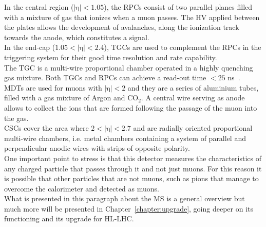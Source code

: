 \vspace{\baselineskip}
In the central region ($\mathrm {|\eta | <1.05}$), the RPCs consist of two parallel planes filled with a mixture of gas that ionizes when a muon passes.
The HV applied between the plates allows the development of avalanches, along the ionization track towards the anode, which constitutes a signal.\\
In the end-cap ($\mathrm {1.05<|\eta |<2.4}$), TGCs are used to complement the RPCs in the triggering system for their good time resolution and rate capability. 
\\The TGC is a multi-wire proportional chamber operated in a highly quenching gas mixture.
Both TGCs and RPCs can achieve a read-out time $\mathrm {<25}$ ns~\cite{MS}.
\vspace{\baselineskip}
\\MDTs are used for muons with $\mathrm {|\eta | <2} $ and they are a series of aluminium tubes, filled with a gas mixture of Argon and $\mathrm {CO_2}$.
A central wire serving as anode allows to collect the ions that are formed following the passage of the muon into the gas.
\\CSCs cover the area where $ \mathrm {2 <| \eta | <2.7} $ and are radially oriented proportional multi-wire chambers, i.e. metal chambers containing a system of parallel and perpendicular 
anodic wires with strips of opposite polarity.
\vspace{\baselineskip}
\\One important point to stress is that this detector measures the characteristics of any charged particle that passes through it and not just muons.
For this reason it is possible that other particles that are not muons, such as pions that manage to overcome the calorimeter and detected as muons.\\
What is presented in this paragraph about the MS is a general overview but much more will be presented in Chapter~\ref{chapter:upgrade}, going deeper on its functioning
and its upgrade for HL-LHC.

\FloatBarrier
